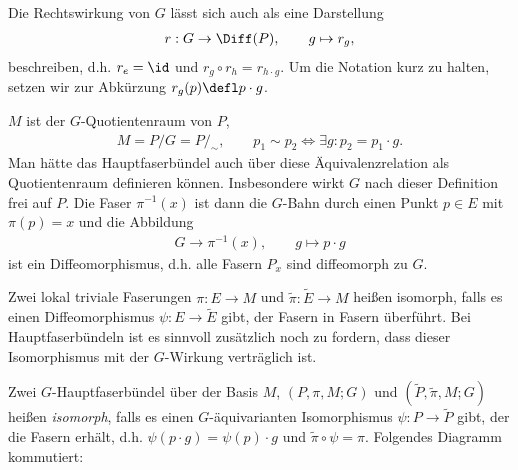 \documentclass[%
	paper=a5,%
	fleqn,%
	DIV=18,%
	BCOR=0mm,
	fontsize=11pt,
	titlepage=false,%
	bibliography=totoc,
	DIV=18,%
	twoside=true,
	pdftitle=Riemannsche Geometrie,
	pdfauthor=Uwe Semmelmann,
	numbers=noendperiod]%
	{scrbook}
\begin{document}
\begin{rem}[Bemerkungen.]
\begin{remenum}
\item
Die Rechtswirkung von $G$ lässt sich auch als eine Darstellung
\begin{align*}
r: G\to \Diff(P),\qquad g\mapsto r_g,
\end{align*}
beschreiben, d.h.  $r_e = \id$ und $r_g\circ r_h = r_{h\cdot g}$. Um die Notation
kurz zu halten, setzen wir zur Abkürzung $r_g(p)\defl p\cdot g$.
\item
$M$ ist der $G$-Quotientenraum von $P$,
\begin{align*}
M = P/G = P/_\sim,\qquad p_1\sim p_2 \iff \exists g : p_2 = p_1\cdot g.
\end{align*}
Man hätte das Hauptfaserbündel auch über diese Äquivalenzrelation als
Quotientenraum definieren können. Insbesondere wirkt $G$ nach dieser Definition
frei auf $P$. Die Faser $\pi^{-1}(x)$ ist dann die $G$-Bahn durch einen Punkt $p\in E$ mit
$\pi(p) = x$ und die Abbildung
\begin{align*}
G \to \pi^{-1}(x),\qquad g\mapsto p\cdot g
\end{align*}
ist ein Diffeomorphismus, d.h. alle Fasern $P_x$ sind diffeomorph zu $G$.\map 
\end{remenum}
\end{rem}





Zwei lokal triviale Faserungen $\pi: E\to M$ und $\tilde{\pi}: \tilde{E}\to M$
heißen isomorph, falls es einen Diffeomorphismus $\psi: E\to \tilde{E}$ gibt,
der Fasern in Fasern überführt. Bei Hauptfaserbündeln ist es sinnvoll zusätzlich
noch zu fordern, dass dieser Isomorphismus mit der $G$-Wirkung verträglich ist.

\begin{defn}
Zwei $G$-Hauptfaserbündel über der Basis $M$, $(P,\pi,M;G)$ und
$(\tilde{P},\tilde{\pi},M;G)$ heißen \emph{isomorph}, falls es einen
$G$-äquivarianten Isomorphismus $\psi: P\to \tilde{P}$ gibt, der die Fasern
erhält, d.h.  $\psi(p \cdot g) = \psi(p) \cdot g $ und  $\tilde{\pi} \circ \psi=\pi$. 
Folgendes Diagramm kommutiert:

\centering
{}
\fish
\end{defn}
\end{document}
